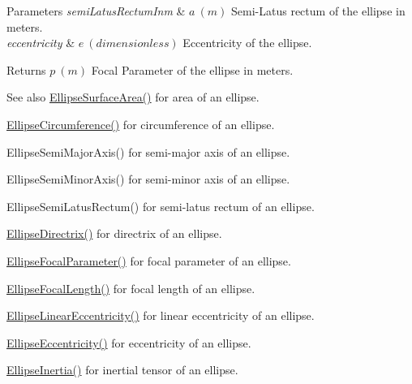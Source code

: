 \begin{DoxyParams}{Parameters}
{\em semi\+Latus\+Rectum\+Inm} & $ a\ (m)$ Semi-\/\+Latus rectum of the ellipse in meters. \\
\hline
{\em eccentricity} & $ e\ (dimensionless)$ Eccentricity of the ellipse. \\
\hline
\end{DoxyParams}
\begin{DoxyReturn}{Returns}
$ p\ (m)$ Focal Parameter of the ellipse in meters. 
\end{DoxyReturn}
\begin{DoxySeeAlso}{See also}
\mbox{\hyperlink{group___e_g_x_math-_geometry-2_d-_ellipse-_surface_area_ga4ce8c8323e9718ce5458f4ab7f6d823d}{Ellipse\+Surface\+Area()}} for area of an ellipse. 

\mbox{\hyperlink{group___e_g_x_math-_geometry-2_d-_ellipse-_circumference_ga4172802ac674eb53467b44928ac635c7}{Ellipse\+Circumference()}} for circumference of an ellipse. 

Ellipse\+Semi\+Major\+Axis() for semi-\/major axis of an ellipse. 

Ellipse\+Semi\+Minor\+Axis() for semi-\/minor axis of an ellipse. 

Ellipse\+Semi\+Latus\+Rectum() for semi-\/latus rectum of an ellipse. 

\mbox{\hyperlink{group___e_g_x_math-_geometry-2_d-_ellipse-_directrix_gace8f72a8efbc9c18d3eb689151405106}{Ellipse\+Directrix()}} for directrix of an ellipse. 

\mbox{\hyperlink{group___e_g_x_math-_geometry-2_d-_ellipse-_focal_parameter_ga4cd01a38c72c092ef9791351948bf69b}{Ellipse\+Focal\+Parameter()}} for focal parameter of an ellipse. 

\mbox{\hyperlink{group___e_g_x_math-_geometry-2_d-_ellipse-_focal_length_gab8d63de7640c880cfecaeada6f2afdac}{Ellipse\+Focal\+Length()}} for focal length of an ellipse. 

\mbox{\hyperlink{group___e_g_x_math-_geometry-2_d-_ellipse-_linear_eccentricity_gac70b3010e30aa8b73deb50fe2b9b9a91}{Ellipse\+Linear\+Eccentricity()}} for linear eccentricity of an ellipse. 

\mbox{\hyperlink{group___e_g_x_math-_geometry-2_d-_ellipse-_eccentricity_ga6a0a7fba17f782616894cfc447628c33}{Ellipse\+Eccentricity()}} for eccentricity of an ellipse. 

\mbox{\hyperlink{group___e_g_x_math-_geometry-2_d-_ellipse-_inertia_ga10a3049c2f04b50f271fb01dc62e4cf8}{Ellipse\+Inertia()}} for inertial tensor of an ellipse. 
\end{DoxySeeAlso}
\mbox{\label{group___e_g_x_math-_geometry-2_d-_ellipse-_focal_parameter_ga406c026954d4f5b357e0310461ed4d1d}} 
